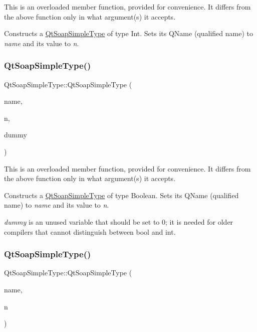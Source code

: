 This is an overloaded member function, provided for convenience. It differs from the above function only in what argument(s) it accepts.

Constructs a \mbox{\hyperlink{class_qt_soap_simple_type}{Qt\+Soap\+Simple\+Type}} of type Int. Sets its Q\+Name (qualified name) to {\itshape name} and its value to {\itshape n}. \mbox{\label{class_qt_soap_simple_type_a3cb161c0fb5d1a4b310e97822935f0f8}} 
\subsubsection{\texorpdfstring{Qt\+Soap\+Simple\+Type()}{QtSoapSimpleType()}\hspace{0.1cm}{\footnotesize\ttfamily [4/6]}}
{\footnotesize\ttfamily Qt\+Soap\+Simple\+Type\+::\+Qt\+Soap\+Simple\+Type (\begin{DoxyParamCaption}\item[{const \mbox{\hyperlink{class_qt_soap_q_name}{Qt\+Soap\+Q\+Name}} \&}]{name,  }\item[{bool}]{n,  }\item[{int}]{dummy }\end{DoxyParamCaption})}

This is an overloaded member function, provided for convenience. It differs from the above function only in what argument(s) it accepts.

Constructs a \mbox{\hyperlink{class_qt_soap_simple_type}{Qt\+Soap\+Simple\+Type}} of type Boolean. Sets its Q\+Name (qualified name) to {\itshape name} and its value to {\itshape n}.

{\itshape dummy} is an unused variable that should be set to 0; it is needed for older compilers that cannot distinguish between bool and int. \mbox{\label{class_qt_soap_simple_type_aa71a79ea37f68605be315f95cbc909e7}} 
\subsubsection{\texorpdfstring{Qt\+Soap\+Simple\+Type()}{QtSoapSimpleType()}\hspace{0.1cm}{\footnotesize\ttfamily [5/6]}}
{\footnotesize\ttfamily Qt\+Soap\+Simple\+Type\+::\+Qt\+Soap\+Simple\+Type (\begin{DoxyParamCaption}\item[{const \mbox{\hyperlink{class_qt_soap_q_name}{Qt\+Soap\+Q\+Name}} \&}]{name,  }\item[{const Q\+String \&}]{n }\end{DoxyParamCaption})}

